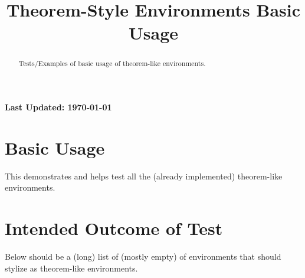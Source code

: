 \documentclass{ximera}
\title{Theorem-Style Environments Basic Usage}
\begin{document}
\begin{abstract}
    Tests/Examples of basic usage of theorem-like environments.
\end{abstract}
\maketitle

{{\Huge \bfseries Last Updated: \today}} \\


\section{Basic Usage}
This demonstrates and helps test all the (already implemented) theorem-like environments.

\section{Intended Outcome of Test}
Below should be a (long) list of (mostly empty) of environments that should stylize as theorem-like environments.
\end{document}

